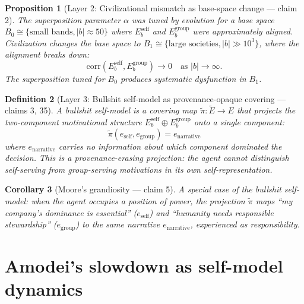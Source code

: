 \documentclass[11pt,a4paper]{article}
\newtheorem{definition}{Definition}[section]
\newtheorem{proposition}[definition]{Proposition}
\newtheorem{corollary}[definition]{Corollary}
\begin{document}
\begin{proposition}[Layer 2: Civilizational mismatch as base-space change --- claim 2]
\label{prop:layer2}
The superposition parameter $\alpha$ was tuned by evolution for a base space
$B_0 \cong \{\text{small bands}, |b| \approx 50\}$ where
$E_b^{\text{self}}$ and $E_b^{\text{group}}$ were approximately aligned.
Civilization changes the base space to
$B_1 \cong \{\text{large societies}, |b| \gg 10^3\}$, where the alignment
breaks down:
\[
  \text{corr}(E_b^{\text{self}}, E_b^{\text{group}}) \to 0
  \quad \text{as } |b| \to \infty.
\]
The superposition tuned for $B_0$ produces systematic dysfunction in $B_1$.
\end{proposition}

\begin{definition}[Layer 3: Bullshit self-model as provenance-opaque covering --- claims 3, 35]
\label{def:bullshit}
A \emph{bullshit self-model} is a covering map $\tilde{\pi} : \tilde{E} \to E$
that projects the two-component motivational structure
$E_b^{\text{self}} \oplus E_b^{\text{group}}$ onto a single component:
\[
  \tilde{\pi}(e_{\text{self}}, e_{\text{group}}) = e_{\text{narrative}}
\]
where $e_{\text{narrative}}$ carries no information about which component
dominated the decision. This is a provenance-erasing projection: the agent
cannot distinguish self-serving from group-serving motivations in its own
self-representation.
\end{definition}

\begin{corollary}[Moore's grandiosity --- claim 5]
A special case of the bullshit self-model: when the agent occupies a position
of power, the projection $\tilde{\pi}$ maps ``my company's dominance is
essential'' ($e_{\text{self}}$) and ``humanity needs responsible stewardship''
($e_{\text{group}}$) to the same narrative $e_{\text{narrative}}$, experienced
as responsibility.
\end{corollary}

\section{Amodei's slowdown as self-model dynamics}
\label{sec:amodei}
\end{document}
